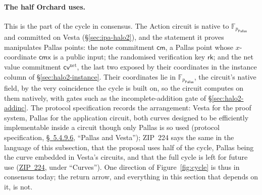 \documentclass[11pt,a4paper]{article}
\theoremstyle{definition}
\newcommand{\F}{\mathbb{F}}
\newcommand{\cmsym}{\mathsf{cm}}
\newcommand{\cmx}{\mathsf{cmx}}
\newcommand{\cvsym}{\mathsf{cv}}
\newcommand{\rk}{\mathsf{rk}}
\newcommand{\Pallas}{\ensuremath{\mathsf{Pallas}}}
\begin{document}
\paragraph{The half Orchard uses.}
This is the part of the cycle in consensus. The Action circuit is
native to $\F_{p_{\Pallas}}$ and committed on Vesta
(\S\ref{sec:ipa-halo2}), and the statement it proves manipulates
Pallas points: the note commitment $\cmsym$, a Pallas point whose
$x$-coordinate $\cmx$ is a public input; the randomised verification
key $\rk$; and the net value commitment $\cvsym^{\mathrm{net}}$, the
last two exposed by their coordinates in the instance column of
\S\ref{sec:halo2-instance}. Their coordinates lie in
$\F_{p_{\Pallas}}$, the circuit's native field, by the very coincidence
the cycle is built on, so the circuit computes on them natively, with
gates such as the incomplete-addition gate of \S\ref{sec:halo2-addinc}.
The protocol
specification records the arrangement: Vesta for the proof system,
Pallas for the application circuit, both curves designed to be
efficiently implementable inside a circuit though only Pallas is so
used (protocol specification,
\href{https://zips.z.cash/protocol/protocol.pdf\#pallasandvesta}{\S~5.4.9.6},
``Pallas and Vesta''); ZIP~224 says the same in the language of this
subsection, that the proposal uses half of the cycle, Pallas being the
curve embedded in Vesta's circuits, and that the full cycle is left for
future use (\href{https://zips.z.cash/zip-0224}{ZIP~224}, under
``Curves''). One direction of Figure~\ref{fig:cycle} is thus in
consensus today; the return arrow, and everything in this section that
depends on it, is not.
\end{document}

